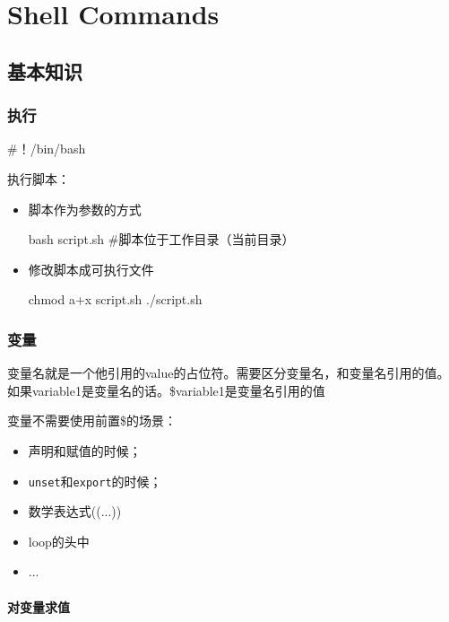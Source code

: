 \chapter{Shell Commands}

\section{基本知识}

\subsection{执行}

\begin{Bash}[开头告诉shell使用什么bash]
#！/bin/bash
\end{Bash}


执行脚本：

\begin{itemize}
\item 脚本作为参数的方式
\begin{Bash}
bash script.sh   #脚本位于工作目录（当前目录）
\end{Bash}

\item 修改脚本成可执行文件

\begin{Bash}[内核会读取首行来确定执行的bash]
chmod a+x script.sh
./script.sh
\end{Bash}

\end{itemize}

\subsection{变量}

变量名就是一个他引用的value的占位符。需要区分变量名，和变量名引用的值。如果variable1是变量名的话。\$variable1是变量名引用的值

变量不需要使用前置\$的场景：
\begin{itemize}
\item 声明和赋值的时候；
\item \lstinline$unset$和\lstinline$export$的时候；
\item 数学表达式((...))
\item loop的头中
\item ...
\end{itemize}


\subsubsection{对变量求值}

